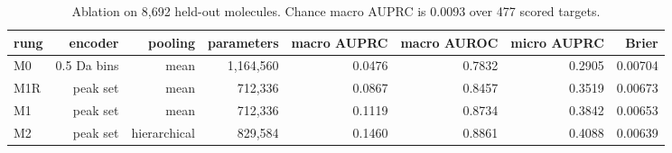 \begin{table}[htbp]
\centering
\caption{Ablation on 8,692 held-out molecules. Chance macro AUPRC is 0.0093 over 477 scored targets.}
\label{tab:table2_ablation}
\begin{tabular}{l r r r r r r r}
\toprule
rung & encoder & pooling & parameters & macro AUPRC & macro AUROC & micro AUPRC & Brier \\
\midrule
M0 & 0.5 Da bins & mean & 1,164,560 & 0.0476 & 0.7832 & 0.2905 & 0.00704 \\
M1R & peak set & mean & 712,336 & 0.0867 & 0.8457 & 0.3519 & 0.00673 \\
M1 & peak set & mean & 712,336 & 0.1119 & 0.8734 & 0.3842 & 0.00653 \\
M2 & peak set & hierarchical & 829,584 & 0.1460 & 0.8861 & 0.4088 & 0.00639 \\
\bottomrule
\end{tabular}
\end{table}
